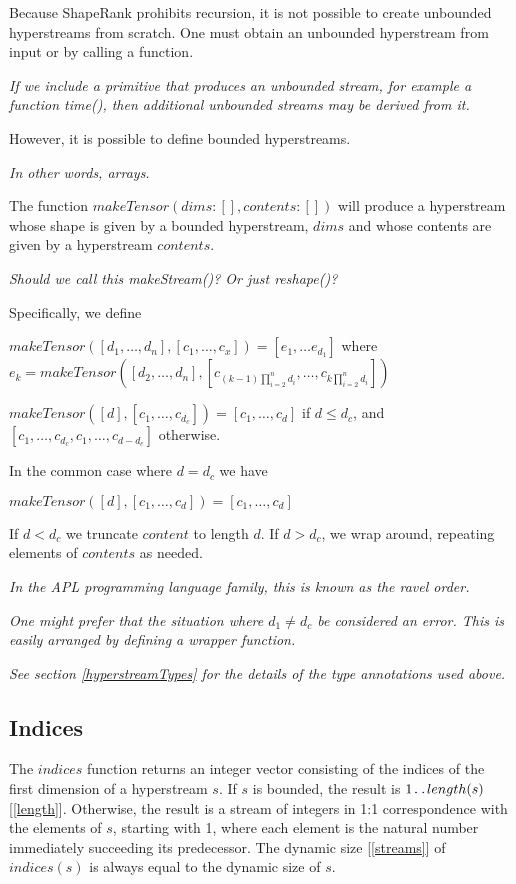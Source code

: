 \documentclass{article}
\begin{document}
Because ShapeRank prohibits recursion, it is not possible to create unbounded hyperstreams from scratch. One must obtain an unbounded hyperstream from input or by calling a function.

{\em
If we include a primitive that produces an unbounded stream, for example a function {\em time()}, then additional
unbounded streams may be derived from it.
}

However, it is possible to define bounded hyperstreams.

{\em In other words, arrays.}

The function $makeTensor(dims: [], contents: [])$
will produce a hyperstream whose shape is given by a bounded hyperstream, $dims$ and whose contents are given by a hyperstream $contents$.

{\em
Should we call this makeStream()? Or just reshape()?
}

Specifically, we define

$makeTensor([d_1, \ldots, d_n], [c_1, \ldots, c_x]) = [e_1, \ldots e_{d_1}]$ where  
\newline 
$e_k  = makeTensor([d_2, \ldots, d_n], [c_{(k -1)\prod_{i=2}^{n} d_i}, \ldots, c_{k\prod_{i=2}^{n}d_i}])$

$makeTensor([d], [c_1, \ldots, c_{d_c}]) = [c_1, \ldots, c_d]$ if $d \le d_c$, and $[c_1, \ldots, c_{d_c}, c_1, \ldots, c_{d -d_c}]$ otherwise.

{\em 

In the common case where $d = d_c$ we have

$makeTensor([d], [c_1, \ldots, c_d]) = [c_1, \ldots, c_d]$

If $d < d_c$ we truncate $content$ to length $d$.
If $d > d_c$, we wrap around, repeating elements of $contents$ as needed.
}

{\em In the APL programming language family, this is known as the ravel order.}

{\em
One might prefer that the situation where $d_1 \ne d_c$ be considered an error.  This is easily arranged by defining a wrapper function.
}

{\em
See section \ref{hyperstreamTypes} for the details of the type annotations used above.
}

\subsection{Indices}
\label{indices}

The $indices$ function returns an integer vector consisting of the indices of the first dimension of a hyperstream $s$. If $s$ is bounded, the result is $1 \texttt{\color{blue} ..}{} length(s)$ [\ref{length}].  Otherwise, the result is a stream of integers in 1:1 correspondence with the elements of $s$, starting with 1, where each element is the natural number immediately succeeding its predecessor. The dynamic size [\ref{streams}] of $indices(s)$ is always equal to the dynamic size of $s$.
\end{document}
